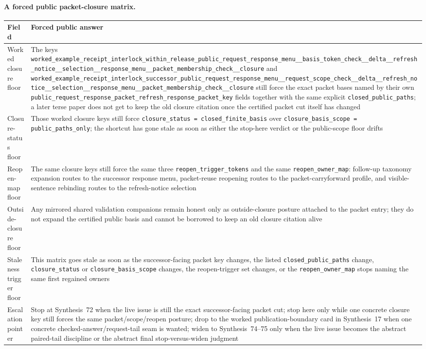 \documentclass[11pt]{article}
\begin{document}
\paragraph{A forced public packet-closure matrix.}
\begin{table}[t]
\centering
\small
\begin{tabularx}{\linewidth}{@{}lX@{}}
\toprule
Field & Forced public answer \\
\midrule
Worked closure floor & The keys \nolinkurl{worked_example_receipt_interlock_within_release_public_request_response_menu__basis_token_check__delta__refresh_notice__selection__response_menu__packet_membership_check__closure} and \nolinkurl{worked_example_receipt_interlock_successor_public_request_response_menu__request_scope_check__delta__refresh_notice__selection__response_menu__packet_membership_check__closure} still force the exact packet bases named by their own \nolinkurl{public_request_response_packet_refresh_response_packet_key} fields together with the same explicit \nolinkurl{closed_public_paths}; a later terse paper does not get to keep the old closure citation once the certified packet cut itself has changed \\
Closure-status floor & Those worked closure keys still force \nolinkurl{closure_status = closed_finite_basis} over \nolinkurl{closure_basis_scope = public_paths_only}; the shortcut has gone stale as soon as either the stop-here verdict or the public-scope floor drifts \\
Reopen-map floor & The same closure keys still force the same three \nolinkurl{reopen_trigger_tokens} and the same \nolinkurl{reopen_owner_map}: follow-up taxonomy expansion routes to the successor response menu, packet-reuse reopening routes to the packet-carryforward profile, and visible-sentence rebinding routes to the refresh-notice selection \\
Outside-closure floor & Any mirrored shared validation companions remain honest only as outside-closure posture attached to the packet entry; they do not expand the certified public basis and cannot be borrowed to keep an old closure citation alive \\
Staleness trigger floor & This matrix goes stale as soon as the successor-facing packet key changes, the listed \nolinkurl{closed_public_paths} change, \nolinkurl{closure_status} or \nolinkurl{closure_basis_scope} changes, the reopen-trigger set changes, or the \nolinkurl{reopen_owner_map} stops naming the same first regained owners \\
Escalation pointer & Stop at Synthesis~72 when the live issue is still the exact successor-facing packet cut; stop here only while one concrete closure key still forces the same packet/scope/reopen posture; drop to the worked publication-boundary card in Synthesis~17 when one concrete checked-answer/request-tail seam is wanted; widen to Synthesis~74--75 only when the live issue becomes the abstract paired-tail discipline or the abstract final stop-versus-widen judgment \\

\end{tabularx}
\end{table}
\end{document}
